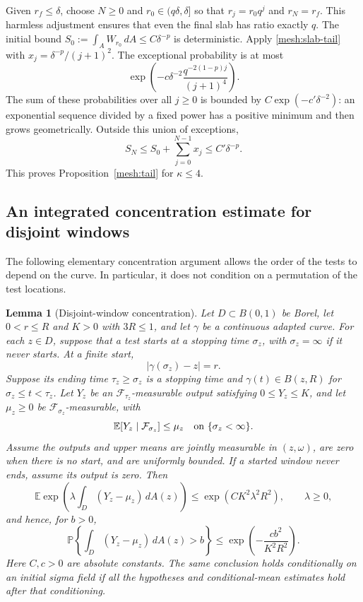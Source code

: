 \documentclass[11pt]{article}
\newtheorem{lemma}[theorem]{Lemma}
\theoremstyle{definition}
\theoremstyle{remark}
\numberwithin{equation}{section}
\begin{document}
Given $r_f\le\delta$, choose $N\ge0$ and
$r_0\in(q\delta,\delta]$ so that $r_j=r_0q^j$ and $r_N=r_f$.
This harmless adjustment ensures that even the final slab has ratio
exactly $q$.  The initial bound
$S_0:=\int_AW_{r_0}\,dA\le C\delta^{-p}$ is deterministic.
Apply \eqref{mesh:slab-tail} with
$x_j=\delta^{-p}/(j+1)^2$.  The exceptional probability is at most
\[
 \exp\left(-c\delta^{-2}
       \frac{q^{-2(1-p)j}}{(j+1)^4}\right).
\]
The sum of these probabilities over all $j\ge0$ is bounded by
$C\exp(-c'\delta^{-2})$: an exponential sequence divided by a fixed
power has a positive minimum and then grows geometrically.  Outside
this union of exceptions,
\[
 S_N\le S_0+\sum_{j=0}^{N-1}x_j\le C'\delta^{-p}.
\]
This proves Proposition~\ref{mesh:tail} for $\kappa\le4$.


\subsection{An integrated concentration estimate for disjoint windows}

The following elementary concentration argument allows the order of the
tests to depend on the curve.  In particular, it does not condition on a
permutation of the test locations.

\begin{lemma}[Disjoint-window concentration]\label{win:concentration}
Let $D\subset B(0,1)$ be Borel, let $0<r\le R$ and $K>0$ with $3R\le1$, and let
$\gamma$ be a continuous adapted curve.  For each $z\in D$, suppose that
a test starts at a stopping time $\sigma_z$, with $\sigma_z=\infty$ if it
never starts.  At a finite start,
\[
 |\gamma(\sigma_z)-z|=r.
\]
Suppose its ending time $\tau_z\ge\sigma_z$ is a stopping time and
$\gamma(t)\in B(z,R)$ for $\sigma_z\le t<\tau_z$.
Let $Y_z$ be an $\mathcal F_{\tau_z}$-measurable output satisfying
$0\le Y_z\le K$, and let $\mu_z\ge0$ be $\mathcal F_{\sigma_z}$-measurable,
with
\[
 \mathbb E[Y_z\mid\mathcal F_{\sigma_z}]\le\mu_z
 \quad\hbox{on }\{\sigma_z<\infty\}.
\]
Assume the outputs and upper means are jointly measurable in $(z,\omega)$,
are zero when there is no start, and are uniformly bounded.  If a started
window never ends, assume its output is zero.  Then
\begin{equation}
 \mathbb E\exp\left(\lambda\int_D(Y_z-\mu_z)\,dA(z)\right)
       \le \exp(CK^2\lambda^2 R^2),\qquad \lambda\ge0,
 \label{win:mgf}
\end{equation}
and hence, for $b>0$,
\begin{equation}
 \mathbb P\left\{\int_D(Y_z-\mu_z)\,dA(z)>b\right\}
       \le \exp\left(-\frac{c b^2}{K^2R^2}\right).
 \label{win:tail}
\end{equation}
Here $C,c>0$ are absolute constants.  The same conclusion holds
conditionally on an initial sigma field if all the hypotheses and
conditional-mean estimates hold after that conditioning.
\end{lemma}
\end{document}
